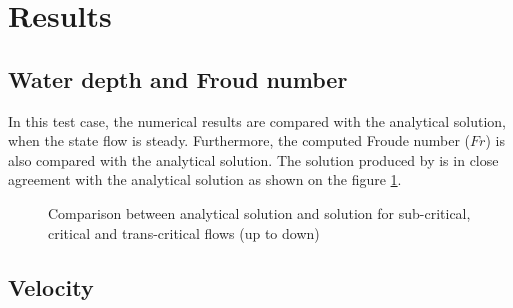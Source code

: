 \section{Results}

\subsection{Water depth and Froud number}

In this test case, the numerical results are compared with the
analytical solution, when the state flow is steady. Furthermore, the computed
Froude number ($Fr$) is also
compared with the analytical solution.
The solution produced by  is in close agreement with
the analytical solution as shown on the figure \ref{fig:bumpsub:fig:hfr}.


\begin{figure}[H]
\begin{minipage}[t]{0.5\textwidth}
 \centering
\end{minipage}%
\begin{minipage}[t]{0.5\textwidth}
 \centering
\end{minipage}
\begin{minipage}[t]{0.5\textwidth}
 \centering
\end{minipage}%
\begin{minipage}[t]{0.5\textwidth}
 \centering
\end{minipage}
\begin{minipage}[t]{0.5\textwidth}
 \centering
\end{minipage}%
\begin{minipage}[t]{0.5\textwidth}
 \centering
\end{minipage}
  \caption{Comparison between analytical solution and 
 solution for sub-critical, critical and trans-critical flows (up to down)}\label{fig:bumpsub:fig:hfr}
\end{figure}

\subsection{Velocity}

